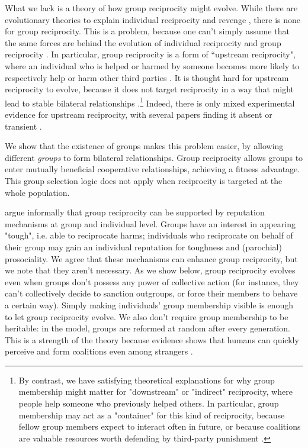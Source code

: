 \documentclass[12pt,a4paper]{article}
\begin{document}
What we lack is a theory of how group reciprocity might evolve. While there
are evolutionary theories to explain individual reciprocity and revenge
\parencite{mccullough2013cognitive}, there is none for group reciprocity. This is
a problem, because one can't simply assume that the same forces are behind the evolution of 
individual reciprocity and group reciprocity 
\parencite{pietraszewski2013elementary,mccullough2013putting}. 
In particular, group reciprocity is a form of ``upstream reciprocity", where an individual
who is helped or harmed by someone becomes more likely to respectively help 
or harm other third parties \parencite{boyd1989evolution}. It is thought hard 
for upstream reciprocity to evolve,
because it does not target reciprocity in a way that might lead to stable 
bilateral relationships \parencite{nowak2007upstream}.\footnote{By contrast,
we have satisfying theoretical explanations for why group membership might
matter for "downstream" or "indirect" reciprocity, where people help someone
who previously helped others. In particular, group membership may act as a 
"container" for this kind of reciprocity, because fellow group members
expect to interact often in future, or because coalitions are valuable
resources worth defending by third-party punishment
\parencite{yamagishi2000thegroup,romano2022direct,delton2017psychology}.} Indeed,
there is only mixed experimental evidence for upstream reciprocity, with
several papers finding it absent or transient \parencite{ben2004reciprocity,stanca2009measuring,van2016indirect,horita2016transient,greiner2005indirect}.
 
We show that the existence of groups makes this problem easier, by allowing 
different \emph{groups} to form bilateral relationships. Group reciprocity 
allows groups to enter mutually beneficial cooperative relationships, achieving 
a fitness advantage. This group selection logic does not apply when reciprocity is 
targeted at the whole population.

\textcite{columbus2023parochial} argue informally that group reciprocity can
be supported by reputation mechanisms at group and individual level. Groups
have an interest in appearing "tough", i.e. able to reciprocate harms; individuals
who reciprocate on behalf of their group may gain an individual reputation for
toughness and (parochial) prosociality. We agree that these mechanisms can enhance
group reciprocity, but we note that they aren't necessary. As we show below,
group reciprocity evolves even when groups don't possess any power of collective 
action (for instance, they can't collectively decide to sanction outgroups, or 
force their members to behave a certain way). Simply making individuals' group 
membership visible is enough to let group reciprocity evolve. We also don't require
group membership to be heritable: in the model, groups are reformed at random
after every generation. This is a strength of the theory because evidence shows 
that humans can quickly perceive and form coalitions even among strangers 
\parencite{tajfel1971social,kurzban2001can,tooby2010groups}.
\end{document}
